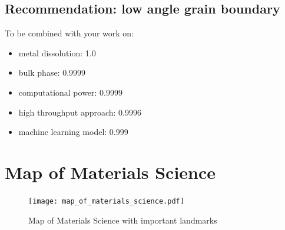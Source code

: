 \documentclass{article}%
\begin{document}
%
\subsection{Recommendation: low angle grain boundary}%
\label{subsec:Recommendationlowanglegrainboundary}%
To be combined with your work on:%
\begin{itemize}%
\item%
metal dissolution: 1.0%
\item%
bulk phase: 0.9999%
\item%
computational power: 0.9999%
\item%
high throughput approach: 0.9996%
\item%
machine learning model: 0.999%
\end{itemize}

%
\section{Map of Materials Science}%
\label{sec:MapofMaterialsScience}%


\begin{figure}[H]%
\centering%
\texttt{[image: map\_of\_materials\_science.pdf]}%
\caption{Map of Materials Science with important landmarks}%
\end{figure}

%
\end{document}
